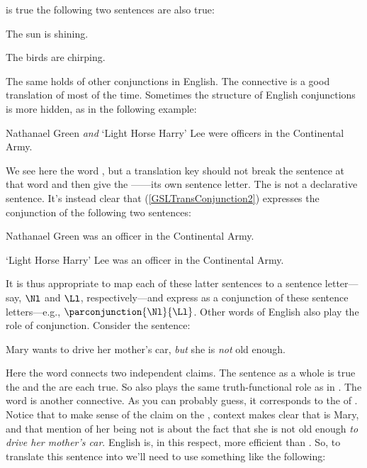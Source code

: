 \noindent{}is true \Iff the following two sentences are also true:

\begin{menumerate}
	\item The sun is shining.
	\item The birds are chirping.
\end{menumerate}

\noindent{}The same holds of other conjunctions in English.  The \GSL{} connective \mention{$\WEDGE$} is a good translation of  most of the time.  Sometimes the structure of English conjunctions is more hidden, as in the following example:

\begin{menumerate}
	\item\label{GSLTransConjunction2} Nathanael Green \emph{and} `Light Horse Harry' Lee were officers in the Continental Army.
\end{menumerate}

\noindent{}We see here the word , but a translation key should not break the sentence at that word and then give the ------its own sentence letter.  The  is not a declarative sentence.  It's instead clear that (\ref{GSLTransConjunction2}) expresses the conjunction of the following two sentences:

\begin{menumerate}
	\item Nathanael Green was an officer in the Continental Army.
	\item `Light Horse Harry' Lee was an officer in the Continental Army.
\end{menumerate}

\noindent{}It is thus appropriate to map each of these latter sentences to a sentence letter---say, $\Nl$ and $\Ll$, respectively---and express  as a conjunction of these sentence letters---e.g., $\parconjunction{\Nl}{\Ll}$.  Other words of English also play the role of conjunction.  Consider the sentence:

\begin{menumerate}
	\item\label{GSLTransConjunction3} Mary wants to drive her mother's car, \emph{but} she is \emph{not} old enough.
\end{menumerate}

\noindent{}Here the word  connects two independent claims.  The sentence as a whole is true \Iff the  and the  are each true.  So  also plays the same truth-functional role as \mention{$\WEDGE$} in \GSL{}.   The word  is another connective.  As you can probably guess, it corresponds to the \mention{$\NEGATION$} of \GSL{}.  Notice that to make sense of the claim on the , context makes clear that  is Mary, and that mention of her being not  is about the fact that she is not old enough \emph{to drive her mother's car}. English is, in this respect, more efficient than \GSL{}. So, to translate this sentence into \GSL{} we'll need to use something like the following:

